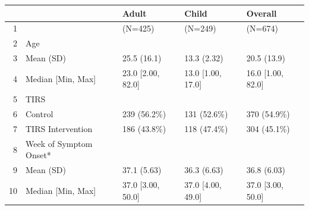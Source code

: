 \begin{table}[ht]
\centering
\begin{tabular}{rllll}
  \hline
 &   & Adult & Child & Overall \\ 
  \hline
1 &  & (N=425) & (N=249) & (N=674) \\ 
  2 & Age &  &  &  \\ 
  3 &   Mean (SD) & 25.5 (16.1) & 13.3 (2.32) & 20.5 (13.9) \\ 
  4 &   Median [Min, Max] & 23.0 [2.00, 82.0] & 13.0 [1.00, 17.0] & 16.0 [1.00, 82.0] \\ 
  5 & TIRS &  &  &  \\ 
  6 &   Control & 239 (56.2\%) & 131 (52.6\%) & 370 (54.9\%) \\ 
  7 &   TIRS Intervention & 186 (43.8\%) & 118 (47.4\%) & 304 (45.1\%) \\ 
  8 & Week of Symptom Onset* &  &  &  \\ 
  9 &   Mean (SD) & 37.1 (5.63) & 36.3 (6.63) & 36.8 (6.03) \\ 
  10 &   Median [Min, Max] & 37.0 [3.00, 50.0] & 37.0 [4.00, 49.0] & 37.0 [3.00, 50.0] \\ 
   \hline
\end{tabular}
\end{table}
